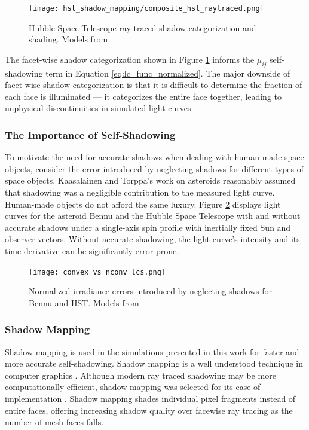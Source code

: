 \graphicspath{{/Users/liamrobinson/Documents/msthesis/static_images/aas_2022_figs}}
\begin{figure}[!htb]
  \centering
  \texttt{[image: hst\_shadow\_mapping/composite\_hst\_raytraced.png]}
  \caption{Hubble Space Telescope ray traced shadow categorization and shading. Models from \cite{nasa_models}}
  \label{fig:hst_shadows_ray}
\end{figure}

The facet-wise shadow categorization shown in Figure \ref{fig:hst_shadows_ray} informs the $\mu_{ij}$ self-shadowing term in Equation \ref{eq:lc_func_normalized}. The major downside of facet-wise shadow categorization is that it is difficult to determine the fraction of each face is illuminated --- it categorizes the entire face together, leading to unphysical discontinuities in simulated light curves.

\subsubsection{The Importance of Self-Shadowing}

To motivate the need for accurate shadows when dealing with human-made space objects, consider the error introduced by neglecting shadows for different types of space objects. Kaasalainen and Torppa's work on asteroids reasonably assumed that shadowing was a negligible contribution to the measured light curve. Human-made objects do not afford the same luxury. Figure \ref{fig:hst_bennu_shadows} displays light curves for the asteroid Bennu and the Hubble Space Telescope with and without accurate shadows under a single-axis spin profile with inertially fixed Sun and observer vectors. Without accurate shadowing, the light curve's intensity and its time derivative can be significantly error-prone.

\begin{figure}[!htb]
  \centering
  \texttt{[image: convex\_vs\_nconv\_lcs.png]}
  \caption{Normalized irradiance errors introduced by neglecting shadows for Bennu and HST. Models from \cite{nasa_models}}
  \label{fig:hst_bennu_shadows}
\end{figure}

\subsubsection{Shadow Mapping} \label{sec:shadow_mapping}

Shadow mapping is used in the simulations presented in this work for faster and more accurate self-shadowing. Shadow mapping is a well understood technique in computer graphics \cite{kolivand2013}. Although modern ray traced shadowing may be more computationally efficient, shadow mapping was selected for its ease of implementation \cite{kolivand2013}. Shadow mapping shades individual pixel fragments instead of entire faces, offering increasing shadow quality over facewise ray tracing as the number of mesh faces falls.

